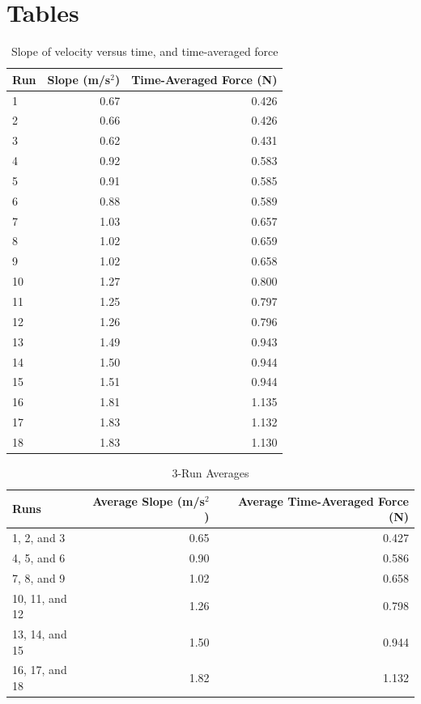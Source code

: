 \section{Tables}
%
\begin{table}[ht]
    \centering
    \begin{tabular}{|l|r|r|}
        \hline
        Run & Slope (m/s$^{2}$) & Time-Averaged Force (N) \\
        \hline
        1 & 0.67 & 0.426 \\
        2 & 0.66 & 0.426 \\
        3 & 0.62 & 0.431 \\
        \hline
        4 & 0.92 & 0.583 \\
        5 & 0.91 & 0.585 \\
        6 & 0.88 & 0.589 \\
        \hline
        7 & 1.03 & 0.657 \\
        8 & 1.02 & 0.659 \\
        9 & 1.02 & 0.658 \\
        \hline
        10 & 1.27 & 0.800 \\
        11 & 1.25 & 0.797 \\
        12 & 1.26 & 0.796 \\
        \hline
        13 & 1.49 & 0.943 \\
        14 & 1.50 & 0.944 \\
        15 & 1.51 & 0.944 \\
        \hline
        16 & 1.81 & 1.135 \\
        17 & 1.83 & 1.132 \\
        18 & 1.83 & 1.130 \\
        \hline
    \end{tabular}
    \caption{Slope of velocity versus time, and time-averaged force}
    \label{table:04.results}
\end{table}
%
\begin{table}[ht]
    \centering
    \begin{tabular}{|l|r|r|}
        \hline
        Runs & Average Slope (m/s$^{2}$) & Average Time-Averaged Force (N) \\
        \hline
        1, 2, and 3 & 0.65 & 0.427 \\
        4, 5, and 6 & 0.90 & 0.586 \\
        7, 8, and 9 & 1.02 & 0.658 \\
        10, 11, and 12 & 1.26 & 0.798 \\
        13, 14, and 15 & 1.50 & 0.944 \\
        16, 17, and 18 & 1.82 & 1.132 \\
        \hline
    \end{tabular}
    \caption{3-Run Averages}
    \label{table:04.averages}
\end{table}
